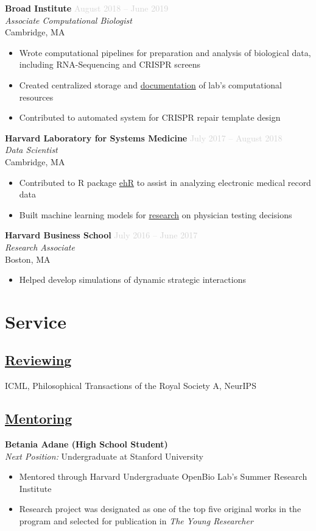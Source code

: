 \documentclass[11pt,a4paper]{article}
\newcommand{\cvitem}[4]{
    \noindent\textbf{#1} \hfill \textcolor{lightgray}{#2} \\
    \textit{#3} \\
    #4 \vspace{6pt}
}
\begin{document}
\cvitem{Broad Institute}{August 2018 -- June 2019}{Associate Computational Biologist}{
    Cambridge, MA
    \begin{itemize}
        \item Wrote computational pipelines for preparation and analysis of biological data, including RNA-Sequencing and CRISPR screens
        \item Created centralized storage and \href{https://xavier-lab.readthedocs.io/en/master/?}{documentation} of lab's computational resources
        \item Contributed to automated system for CRISPR repair template design
    \end{itemize}
}

\cvitem{Harvard Laboratory for Systems Medicine}{July 2017 -- August 2018}{Data Scientist}{
    Cambridge, MA
    \begin{itemize}
        \item Contributed to R package \href{https://github.com/sysmedlab/ehR}{ehR} to assist in analyzing electronic medical record data
        \item Built machine learning models for \href{https://eml.berkeley.edu/~webfac/auerbach/w26168.pdf}{research} on physician testing decisions
    \end{itemize}
}

\cvitem{Harvard Business School}{July 2016 -- June 2017}{Research Associate}{
    Boston, MA
    \begin{itemize}
        \item Helped develop simulations of dynamic strategic interactions
    \end{itemize}
}

\section{Service}

\subsection{\underline{Reviewing}}
ICML, Philosophical Transactions of the Royal Society A, NeurIPS

\subsection{\underline{Mentoring}}
\textbf{Betania Adane (High School Student)} \\
\textit{Next Position:} Undergraduate at Stanford University
\begin{itemize}
    \item Mentored through Harvard Undergraduate OpenBio Lab's Summer Research Institute
    \item Research project was designated as one of the top five original works in the program and selected for publication in \textit{The Young Researcher}
\end{itemize}
\end{document}
